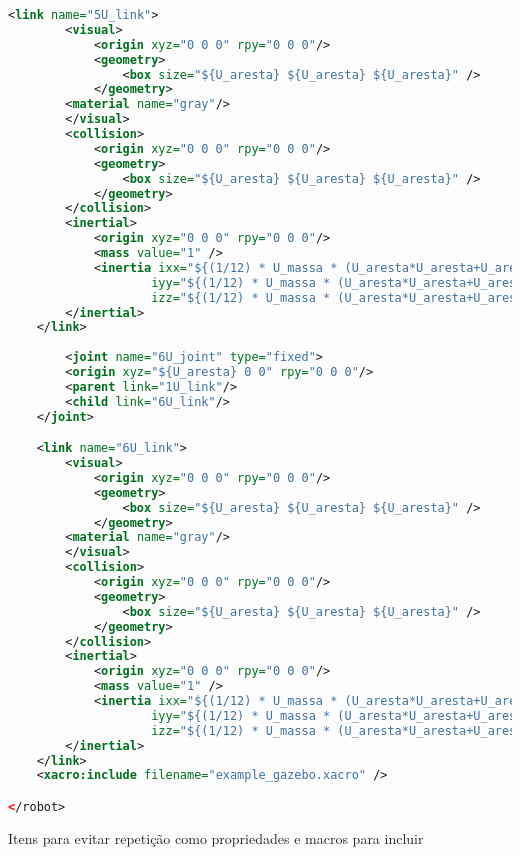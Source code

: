 \begin{lstlisting}[language=XML,caption={XML version}]
    <link name="5U_link">
        <visual>
            <origin xyz="0 0 0" rpy="0 0 0"/>
            <geometry>
                <box size="${U_aresta} ${U_aresta} ${U_aresta}" />
            </geometry>
		<material name="gray"/>
        </visual>
        <collision>
            <origin xyz="0 0 0" rpy="0 0 0"/>
            <geometry>
                <box size="${U_aresta} ${U_aresta} ${U_aresta}" />
            </geometry>
        </collision>
        <inertial>
            <origin xyz="0 0 0" rpy="0 0 0"/>
            <mass value="1" />
            <inertia ixx="${(1/12) * U_massa * (U_aresta*U_aresta+U_aresta*U_aresta)}" ixy="0.0" ixz="0.0"
                    iyy="${(1/12) * U_massa * (U_aresta*U_aresta+U_aresta*U_aresta)}" iyz="0.0"
                    izz="${(1/12) * U_massa * (U_aresta*U_aresta+U_aresta*U_aresta)}" />
        </inertial>
    </link>    
    
        <joint name="6U_joint" type="fixed">
        <origin xyz="${U_aresta} 0 0" rpy="0 0 0"/>
        <parent link="1U_link"/>
        <child link="6U_link"/>
    </joint>

    <link name="6U_link">
        <visual>
            <origin xyz="0 0 0" rpy="0 0 0"/>
            <geometry>
                <box size="${U_aresta} ${U_aresta} ${U_aresta}" />
            </geometry>
		<material name="gray"/>
        </visual>
        <collision>
            <origin xyz="0 0 0" rpy="0 0 0"/>
            <geometry>
                <box size="${U_aresta} ${U_aresta} ${U_aresta}" />
            </geometry>
        </collision>
        <inertial>
            <origin xyz="0 0 0" rpy="0 0 0"/>
            <mass value="1" />
            <inertia ixx="${(1/12) * U_massa * (U_aresta*U_aresta+U_aresta*U_aresta)}" ixy="0.0" ixz="0.0"
                    iyy="${(1/12) * U_massa * (U_aresta*U_aresta+U_aresta*U_aresta)}" iyz="0.0"
                    izz="${(1/12) * U_massa * (U_aresta*U_aresta+U_aresta*U_aresta)}" />
        </inertial>
    </link> 
    <xacro:include filename="example_gazebo.xacro" />

</robot>
\end{lstlisting}

Itens para evitar repetição como propriedades e macros para incluir

